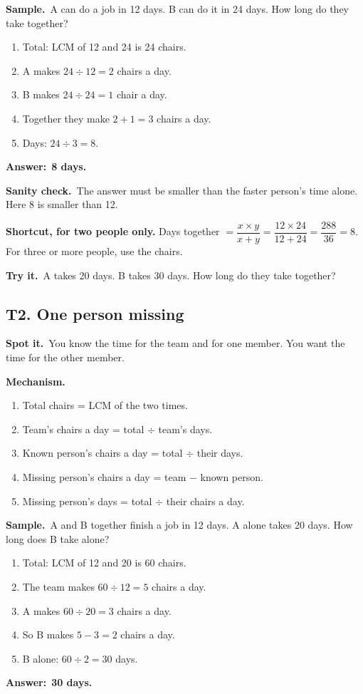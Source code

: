 \documentclass[11pt,a4paper]{article}
\let\oldsubsection\subsection
\renewcommand{\subsection}{\needspace{9\baselineskip}\oldsubsection}
\newcommand{\spot}{\textbf{\color{ember}Spot it.}\ }
\newcommand{\mech}{\textbf{\color{ember}Mechanism.}\ }
\newif\ifkeepsamp
\newcommand{\ans}[1]{\par\nopagebreak\noindent\textbf{\color{ember}Answer:}\ \textbf{#1}\par}
\newcommand{\samp}{\ifkeepsamp\needspace{4\baselineskip}\fi\textbf{\color{ember}Sample.}\ }
\newcommand{\sane}{\textbf{\color{slate}Sanity check.}\ }
\newcommand{\tryit}[1]{\textbf{\color{ember}Try it.}\ #1}
\begin{document}
\samp A can do a job in 12 days. B can do it in 24 days. How long do they take together?
\begin{enumerate}
\item Total: LCM of 12 and 24 is 24 chairs.
\item A makes $24 \div 12 = 2$ chairs a day.
\item B makes $24 \div 24 = 1$ chair a day.
\item Together they make $2 + 1 = 3$ chairs a day.
\item Days: $24 \div 3 = 8$.
\end{enumerate}
\ans{8 days.}

\sane The answer must be smaller than the faster person's time alone. Here 8 is smaller than 12.

\textbf{Shortcut, for two people only.} Days together $=\dfrac{x \times y}{x+y}=\dfrac{12\times 24}{12+24}=\dfrac{288}{36}=8$. For three or more people, use the chairs.

\tryit A takes 20 days. B takes 30 days. How long do they take together?

\subsection{T2. One person missing}
\spot You know the time for the team and for one member. You want the time for the other member.

\mech
\begin{enumerate}
\item Total chairs = LCM of the two times.
\item Team's chairs a day = total $\div$ team's days.
\item Known person's chairs a day = total $\div$ their days.
\item Missing person's chairs a day = team $-$ known person.
\item Missing person's days = total $\div$ their chairs a day.
\end{enumerate}

\samp A and B together finish a job in 12 days. A alone takes 20 days. How long does B take alone?
\begin{enumerate}
\item Total: LCM of 12 and 20 is 60 chairs.
\item The team makes $60 \div 12 = 5$ chairs a day.
\item A makes $60 \div 20 = 3$ chairs a day.
\item So B makes $5 - 3 = 2$ chairs a day.
\item B alone: $60 \div 2 = 30$ days.
\end{enumerate}
\ans{30 days.}
\end{document}
